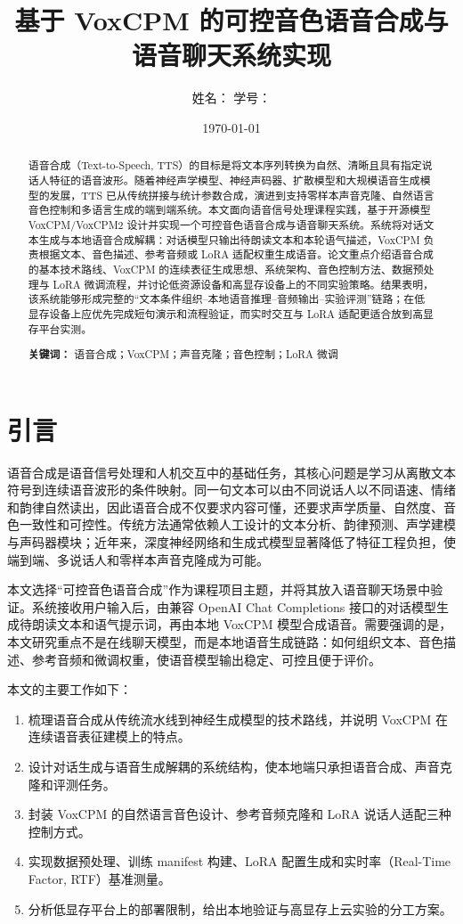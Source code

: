\documentclass[UTF8,a4paper,12pt]{ctexart}
\title{\zihao{2}\heiti 基于 VoxCPM 的可控音色语音合成与语音聊天系统实现}
\author{\zihao{-4} 姓名：\underline{\hspace{4cm}} \quad 学号：\underline{\hspace{4cm}}}
\date{\zihao{-4}\today}
\begin{document}
\maketitle

\begin{abstract}
语音合成（Text-to-Speech, TTS）的目标是将文本序列转换为自然、清晰且具有指定说话人特征的语音波形。随着神经声学模型、神经声码器、扩散模型和大规模语音生成模型的发展，TTS 已从传统拼接与统计参数合成，演进到支持零样本声音克隆、自然语言音色控制和多语言生成的端到端系统。本文面向语音信号处理课程实践，基于开源模型 VoxCPM/VoxCPM2 设计并实现一个可控音色语音合成与语音聊天系统。系统将对话文本生成与本地语音合成解耦：对话模型只输出待朗读文本和本轮语气描述，VoxCPM 负责根据文本、音色描述、参考音频或 LoRA 适配权重生成语音。论文重点介绍语音合成的基本技术路线、VoxCPM 的连续表征生成思想、系统架构、音色控制方法、数据预处理与 LoRA 微调流程，并讨论低资源设备和高显存设备上的不同实验策略。结果表明，该系统能够形成完整的“文本条件组织--本地语音推理--音频输出--实验评测”链路；在低显存设备上应优先完成短句演示和流程验证，而实时交互与 LoRA 适配更适合放到高显存平台实测。

\textbf{关键词：} 语音合成；VoxCPM；声音克隆；音色控制；LoRA 微调
\end{abstract}

\section{引言}
语音合成是语音信号处理和人机交互中的基础任务，其核心问题是学习从离散文本符号到连续语音波形的条件映射。同一句文本可以由不同说话人以不同语速、情绪和韵律自然读出，因此语音合成不仅要求内容可懂，还要求声学质量、自然度、音色一致性和可控性。传统方法通常依赖人工设计的文本分析、韵律预测、声学建模与声码器模块；近年来，深度神经网络和生成式模型显著降低了特征工程负担，使端到端、多说话人和零样本声音克隆成为可能。

本文选择“可控音色语音合成”作为课程项目主题，并将其放入语音聊天场景中验证。系统接收用户输入后，由兼容 OpenAI Chat Completions 接口的对话模型生成待朗读文本和语气提示词，再由本地 VoxCPM 模型合成语音。需要强调的是，本文研究重点不是在线聊天模型，而是本地语音生成链路：如何组织文本、音色描述、参考音频和微调权重，使语音模型输出稳定、可控且便于评价。

本文的主要工作如下：
\begin{enumerate}
  \item 梳理语音合成从传统流水线到神经生成模型的技术路线，并说明 VoxCPM 在连续语音表征建模上的特点。
  \item 设计对话生成与语音生成解耦的系统结构，使本地端只承担语音合成、声音克隆和评测任务。
  \item 封装 VoxCPM 的自然语言音色设计、参考音频克隆和 LoRA 说话人适配三种控制方式。
  \item 实现数据预处理、训练 manifest 构建、LoRA 配置生成和实时率（Real-Time Factor, RTF）基准测量。
  \item 分析低显存平台上的部署限制，给出本地验证与高显存上云实验的分工方案。
\end{enumerate}
\end{document}
